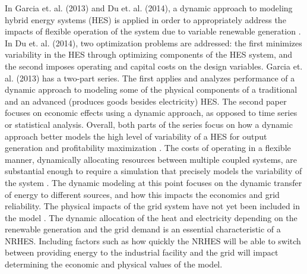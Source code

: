 \documentclass[12pt]{UIdahoMastersThesis}
\begin{document}
In Garcia et. al. (2013) and Du et. al. (2014), a dynamic approach to modeling hybrid energy systems (HES) is applied in order to appropriately address the impacts of flexible operation of the system due to variable renewable generation \cite{Garcia2013, Du2014}. In Du et. al. (2014), two optimization problems are addressed: the first minimizes variability in the HES through optimizing components of the HES system, and the second imposes operating and capital costs on the design variables. Garcia et. al. (2013) has a two-part series. The first applies and analyzes performance of a dynamic approach to modeling some of the physical components of a traditional and an advanced (produces goods besides electricity) HES. The second paper focuses on economic effects using a dynamic approach, as opposed to time series or statistical analysis. Overall, both parts of the series focus on how a dynamic approach better models the high level of variability of a HES for output generation and profitability maximization \cite{Garcia2013}. The costs of operating in a flexible manner, dynamically allocating resources between multiple coupled systems, are substantial enough to require a simulation that precisely models the variability of the system \cite{Garcia2013, Shropshire2011, Locatelli2015}. The dynamic modeling at this point focuses on the dynamic transfer of energy to different sources, and how this impacts the economics and grid reliability. The physical impacts of the grid system have not yet been included in the model \cite{Harrison2016}.  The dynamic allocation of the heat and electricity depending on the renewable generation and the grid demand is an essential characteristic of a NRHES.  Including factors such as how quickly the NRHES will be able to switch between providing energy to the industrial facility and the grid will impact determining the economic and physical values of the model.
\end{document}
